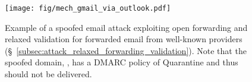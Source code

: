 




\begin{figure}[t]
  \centerline{\texttt{[image: fig/mech\_gmail\_via\_outlook.pdf]}}
  \centering
  \caption[Example of a Spoofed Email Attack Exploiting Open Forwarding]{Example of a spoofed email attack exploiting open forwarding and relaxed validation for forwarded email from well-known providers (\S~\ref{subsec:attack_relaxed_forwarding_validation}).
    Note that the spoofed domain, , has a DMARC policy of Quarantine and thus
    should not be delivered.}
  \label{fig:mech_gmail_via_outlook}
\end{figure}


